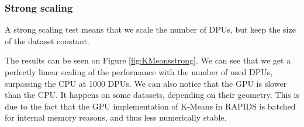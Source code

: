 \subsubsection{Strong scaling}

A strong scaling test means that we scale the number of DPUs, but keep the size of the dataset constant.

The results can be seen on Figure \ref{fig:KMeansstrong}. We can see that we get a perfectly linear scaling of the performance with the number of used DPUs, surpassing the CPU at 1000 DPUs. We can also notice that the GPU is slower than the CPU. It happens on some datasets, depending on their geometry. This is due to the fact that the GPU implementation of K-Means in RAPIDS is batched for internal memory reasons, and thus less numerically stable.

